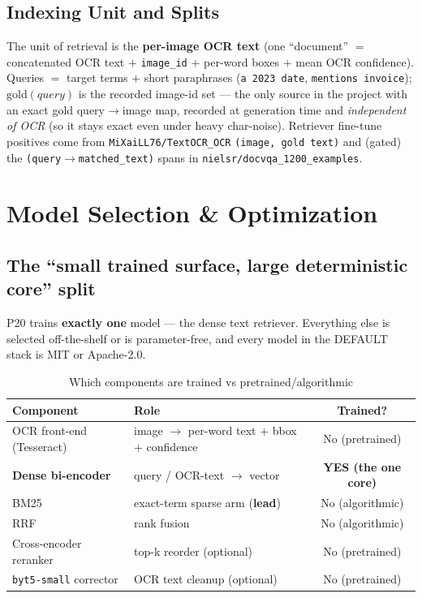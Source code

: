 \documentclass[12pt,a4paper]{article}
\begin{document}
\subsection{Indexing Unit and Splits}

The unit of retrieval is the \textbf{per-image OCR text} (one ``document'' $=$ concatenated OCR text $+$ \texttt{image\_id} $+$ per-word boxes $+$ mean OCR confidence). Queries $=$ target terms $+$ short paraphrases (\texttt{a 2023 date}, \texttt{mentions invoice}); $\text{gold}(query)$ is the recorded image-id set --- the only source in the project with an exact gold query$\rightarrow$image map, recorded at generation time and \emph{independent of OCR} (so it stays exact even under heavy char-noise). Retriever fine-tune positives come from \texttt{MiXaiLL76/TextOCR\_OCR} \texttt{(image, gold text)} and (gated) the \texttt{(query$\rightarrow$matched\_text)} spans in \texttt{nielsr/docvqa\_1200\_examples}.

\section{Model Selection \& Optimization}

\subsection{The ``small trained surface, large deterministic core'' split}

P20 trains \textbf{exactly one} model --- the dense text retriever. Everything else is selected off-the-shelf or is parameter-free, and every model in the DEFAULT stack is MIT or Apache-2.0.

\begin{table}[H]
\centering
\caption{Which components are trained vs pretrained/algorithmic}
\small
\begin{tabularx}{\linewidth}{@{} l L c @{}}
\toprule
\textbf{Component} & \textbf{Role} & \textbf{Trained?} \\
\midrule
OCR front-end (Tesseract) & image $\rightarrow$ per-word text + bbox + confidence & No (pretrained) \\
\textbf{Dense bi-encoder} & query / OCR-text $\rightarrow$ vector & \textbf{YES (the one core)} \\
BM25 & exact-term sparse arm (\textbf{lead}) & No (algorithmic) \\
RRF & rank fusion & No (algorithmic) \\
Cross-encoder reranker & top-k reorder (optional) & No (pretrained) \\
\texttt{byt5-small} corrector & OCR text cleanup (optional) & No (pretrained) \\
\bottomrule
\end{tabularx}
\end{table}
\end{document}
